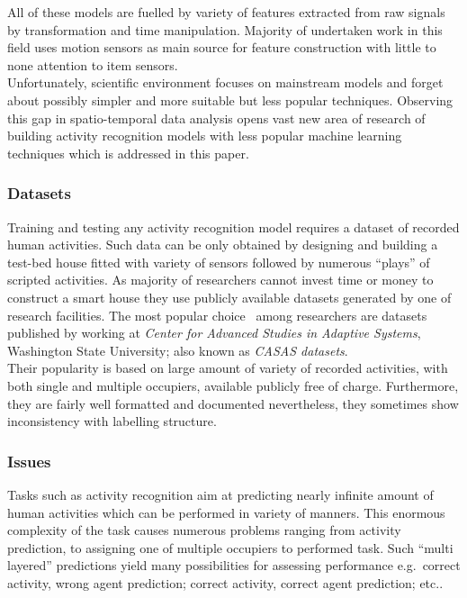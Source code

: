 \documentclass[11pt, a4paper, pdflatex, leqno, twoside, openright]{report}
\begin{document}
All of these models are fuelled by variety of features extracted from raw signals by transformation and time manipulation. Majority of undertaken work in this field uses motion sensors as main source for feature construction with little to none attention to item sensors.\\

Unfortunately, scientific environment focuses on mainstream models and forget about possibly simpler and more suitable but less popular techniques. Observing this gap in spatio-temporal data analysis opens vast new area of research of building activity recognition models with less popular machine learning techniques which is addressed in this paper.

      \subsubsection{Datasets}
Training and testing any activity recognition model requires a dataset of recorded human activities. Such data can be only obtained by designing and building a test-bed house fitted with variety of sensors followed by numerous ``plays'' of scripted activities. As majority of researchers cannot invest time or money to construct a smart house they use publicly available datasets generated by one of research facilities. The most popular choice~\citep{fatima2013unified,fatima2013analysis,nazerfard2010conditional,cook2009assessing} among researchers are datasets published by \citet{cook2009assessing} working at \emph{Center for Advanced Studies in Adaptive Systems}, Washington State University; also known as \emph{CASAS datasets}.\\
Their popularity is based on large amount of variety of recorded activities, with both single and multiple occupiers, available publicly free of charge. Furthermore, they are fairly well formatted and documented nevertheless, they sometimes show inconsistency with labelling structure.

      \subsubsection{Issues}
Tasks such as activity recognition aim at predicting nearly infinite amount of human activities which can be performed in variety of manners. This enormous complexity of the task causes numerous problems ranging from activity prediction, to assigning one of multiple occupiers to performed task. Such ``multi layered'' predictions yield many possibilities for assessing performance e.g.\ correct activity, wrong agent prediction; correct activity, correct agent prediction; etc..\\
\end{document}

